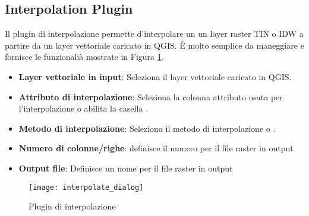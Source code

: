 
\subsection{Interpolation Plugin}


Il plugin di interpolazione permette d'interpolare un un layer raster TIN o IDW a partire da un layer vettoriale caricato in QGIS. È molto semplice da maneggiare e fornisce le funzionalià mostrate in Figura \ref{fig:interpolation_dialog}.

\begin{itemize}
\item \textbf{Layer vettoriale in input}: Seleziona il layer vettoriale caricato in QGIS.
\item \textbf{Attributo di interpolazione}: Seleziona la colonna attributo usata per l'interpolazione o abilita la casella .
\item \textbf{Metodo di interpolazione}: Seleziona il metodo di interpolazione  o .
\item \textbf{Numero di colonne/righe}: definisce il numero per il file raster in output
\item \textbf{Output file}: Definisce un nome per il file raster in output
\end{itemize}

\begin{figure}[ht]
   \begin{center}
   \caption{Plugin di interpolazione\nixcaption}\label{fig:interpolation_dialog}\smallskip
   \texttt{[image: interpolate\_dialog]}
\end{center}  
\end{figure}

